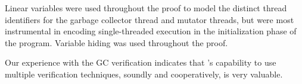 Linear variables were used throughout the proof to model the distinct
thread identifiers for the garbage collector thread and mutator
threads, but were most instrumental in encoding single-threaded
execution in the initialization phase of the program.  
Variable hiding was used throughout the proof. 

Our experience with the GC verification indicates that 
\civl's capability to use multiple verification techniques, soundly and cooperatively, is very valuable. 

